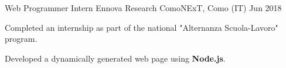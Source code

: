 
\cventry
{Web Programmer Intern}
{Ennova Research}
{ComoNExT, Como (IT)}
{Jun 2018}
{
    \begin{cvitems}
        \item {Completed an internship as part of the national "Alternanza Scuola-Lavoro" program.}
        \item {Developed a dynamically generated web page using \textbf{Node.js}.}
    \end{cvitems}
}
